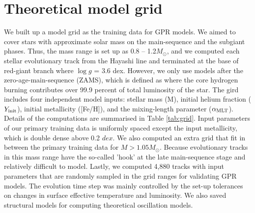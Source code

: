 \section{Theoretical  model grid}\label{sec:grid}

We built up a model grid as the training data for GPR models.  We aimed to cover stars with approximate solar mass on the main-sequence and the subgiant phases. Thus, the mass range is set up as 0.8 -- 1.2$M_{\odot}$, and we computed each stellar evolutionary track from the Hayashi line and terminated at the base of red-giant branch where $\log g$ = 3.6 dex. However, we only use models after the zero-age-main-sequence (ZAMS), which is defined as where the core hydrogen burning contributes over 99.9 percent of total luminosity of the star. 
%
The gird includes four independent model inputs: stellar mass (M), initial helium fraction ($Y_{\rm init}$), initial metallicity ([Fe/H]), and the mixing-length parameter ($\alpha_{\rm MLT}$). Details of the computations are summarised in Table \ref{tab:grid}. Input parameters of our primary training data is uniformly spaced except the input metallicity, which is double dense above 0.2 $dex$. We also computed an extra grid that fit in between the primary training data for $M > 1.05M_{\odot}$. Because evolutionary tracks in this mass range have the so-called 'hook' at the late main-sequence stage and relatively difficult to model. Lastly, we computed 4,880 tracks with input parameters that are randomly sampled in the grid ranges for validating GPR models. The evolution time step was mainly controlled by the set-up tolerances on changes in surface effective temperature and luminosity. We also saved structural models for computing theoretical oscillation models.

